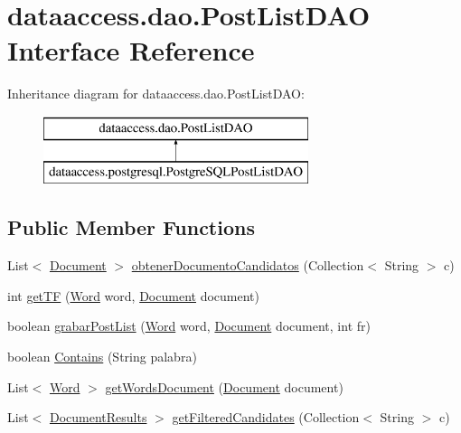 \hypertarget{interfacedataaccess_1_1dao_1_1_post_list_d_a_o}{\section{dataaccess.\-dao.\-Post\-List\-D\-A\-O \-Interface \-Reference}
\label{interfacedataaccess_1_1dao_1_1_post_list_d_a_o}
}
\-Inheritance diagram for dataaccess.\-dao.\-Post\-List\-D\-A\-O\-:\begin{figure}[H]
\begin{center}
\leavevmode
\includegraphics[height=2.000000cm]{interfacedataaccess_1_1dao_1_1_post_list_d_a_o}
\end{center}
\end{figure}
\subsection*{\-Public \-Member \-Functions}
\begin{DoxyCompactItemize}
\item 
\-List$<$ \hyperlink{classcom_1_1utn_1_1searchengine_1_1_document}{\-Document} $>$ \hyperlink{interfacedataaccess_1_1dao_1_1_post_list_d_a_o_ae1ac46108a931391815131e6bd0794fb}{obtener\-Documento\-Candidatos} (\-Collection$<$ \-String $>$ c)
\item 
int \hyperlink{interfacedataaccess_1_1dao_1_1_post_list_d_a_o_a15bf2369736444075e32a151f4a1e0e9}{get\-T\-F} (\hyperlink{classcom_1_1utn_1_1searchengine_1_1_word}{\-Word} word, \hyperlink{classcom_1_1utn_1_1searchengine_1_1_document}{\-Document} document)
\item 
boolean \hyperlink{interfacedataaccess_1_1dao_1_1_post_list_d_a_o_a7a007e8ebaea6254d3c504ff623b0c1e}{grabar\-Post\-List} (\hyperlink{classcom_1_1utn_1_1searchengine_1_1_word}{\-Word} word, \hyperlink{classcom_1_1utn_1_1searchengine_1_1_document}{\-Document} document, int fr)
\item 
boolean \hyperlink{interfacedataaccess_1_1dao_1_1_post_list_d_a_o_a144f8a1120114f180f53f86cfa542122}{\-Contains} (\-String palabra)
\item 
\-List$<$ \hyperlink{classcom_1_1utn_1_1searchengine_1_1_word}{\-Word} $>$ \hyperlink{interfacedataaccess_1_1dao_1_1_post_list_d_a_o_a464d5ede23d1c7b4bf38db9c00b55fd5}{get\-Words\-Document} (\hyperlink{classcom_1_1utn_1_1searchengine_1_1_document}{\-Document} document)
\item 
\-List$<$ \hyperlink{classcom_1_1utn_1_1searchengine_1_1_document_results}{\-Document\-Results} $>$ \hyperlink{interfacedataaccess_1_1dao_1_1_post_list_d_a_o_aca2d8c0b339f8160c8cfde934ba65f4c}{get\-Filtered\-Candidates} (\-Collection$<$ \-String $>$ c)
\end{DoxyCompactItemize}


